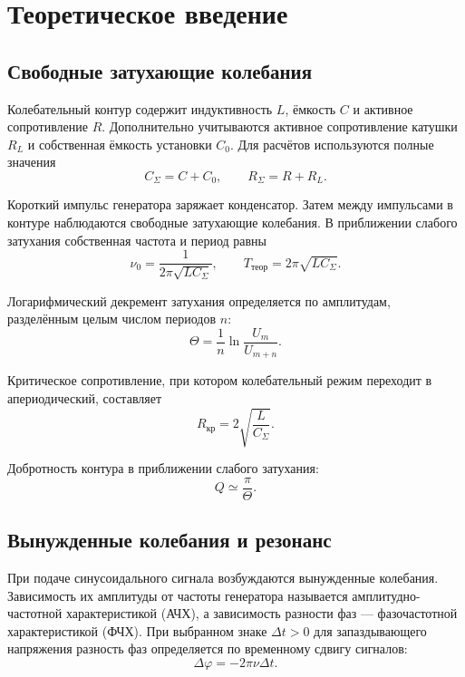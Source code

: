 \documentclass[a4paper,14pt]{extarticle}
\begin{document}

\section{Теоретическое введение}

\subsection{Свободные затухающие колебания}
Колебательный контур содержит индуктивность $L$, ёмкость $C$ и
активное сопротивление $R$. Дополнительно учитываются активное
сопротивление катушки $R_L$ и собственная ёмкость установки $C_0$.
Для расчётов используются полные значения
\begin{equation}
  C_\Sigma=C+C_0, \qquad R_\Sigma=R+R_L.
\end{equation}

Короткий импульс генератора заряжает конденсатор. Затем между
импульсами в контуре наблюдаются свободные затухающие колебания.
В приближении слабого затухания собственная частота и период равны
\begin{equation}
  \nu_0=\frac{1}{2\pi\sqrt{LC_\Sigma}},\qquad
  T_\text{теор}=2\pi\sqrt{LC_\Sigma}.
\end{equation}

Логарифмический декремент затухания определяется по амплитудам,
разделённым целым числом периодов $n$:
\begin{equation}
  \Theta=\frac{1}{n}\ln\frac{U_m}{U_{m+n}}.
\end{equation}

Критическое сопротивление, при котором колебательный режим
переходит в апериодический, составляет
\begin{equation}
  R_\text{кр}=2\sqrt{\frac{L}{C_\Sigma}}.
\end{equation}

Добротность контура в приближении слабого затухания:
\begin{equation}
  Q\simeq\frac{\pi}{\Theta}.
\end{equation}


\subsection{Вынужденные колебания и резонанс}
При подаче синусоидального сигнала возбуждаются вынужденные
колебания. Зависимость их амплитуды от частоты генератора
называется амплитудно-частотной характеристикой (АЧХ),
а зависимость разности фаз --- фазочастотной характеристикой (ФЧХ).
При выбранном знаке $\Delta t>0$ для запаздывающего напряжения
разность фаз определяется по временному сдвигу сигналов:
\begin{equation}
  \Delta\varphi=-2\pi\nu\Delta t.
\end{equation}
\end{document}
